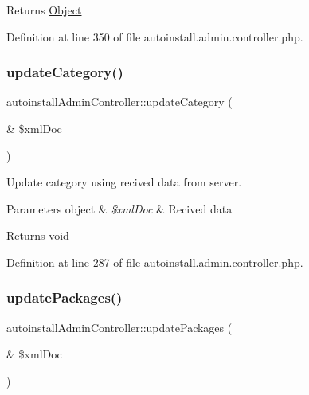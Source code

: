 \begin{DoxyReturn}{Returns}
\hyperlink{classObject}{Object} 
\end{DoxyReturn}


Definition at line 350 of file autoinstall.\+admin.\+controller.\+php.

\hypertarget{classautoinstallAdminController_aaf27c70ad29f65b99cb9d80af6376e37}{}\label{classautoinstallAdminController_aaf27c70ad29f65b99cb9d80af6376e37} 
\subsubsection{\texorpdfstring{update\+Category()}{updateCategory()}}
{\footnotesize\ttfamily autoinstall\+Admin\+Controller\+::update\+Category (\begin{DoxyParamCaption}\item[{\&}]{\$xml\+Doc }\end{DoxyParamCaption})}

Update category using recived data from server.


\begin{DoxyParams}[1]{Parameters}
object & {\em \$xml\+Doc} & Recived data \\
\hline
\end{DoxyParams}
\begin{DoxyReturn}{Returns}
void 
\end{DoxyReturn}


Definition at line 287 of file autoinstall.\+admin.\+controller.\+php.

\hypertarget{classautoinstallAdminController_a1e697b55343500fc590a78c93cd8ee54}{}\label{classautoinstallAdminController_a1e697b55343500fc590a78c93cd8ee54} 
\subsubsection{\texorpdfstring{update\+Packages()}{updatePackages()}}
{\footnotesize\ttfamily autoinstall\+Admin\+Controller\+::update\+Packages (\begin{DoxyParamCaption}\item[{\&}]{\$xml\+Doc }\end{DoxyParamCaption})}

